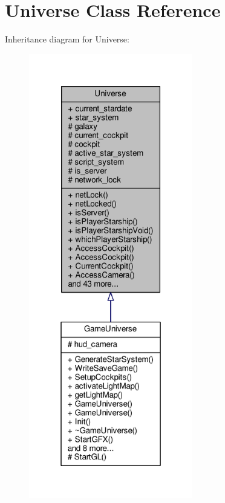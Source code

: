 \hypertarget{classUniverse}{}\section{Universe Class Reference}
\label{classUniverse}


Inheritance diagram for Universe\+:
\nopagebreak
\begin{figure}[H]
\begin{center}
\leavevmode
\includegraphics[height=550pt]{dc/da1/classUniverse__inherit__graph}
\end{center}
\end{figure}



